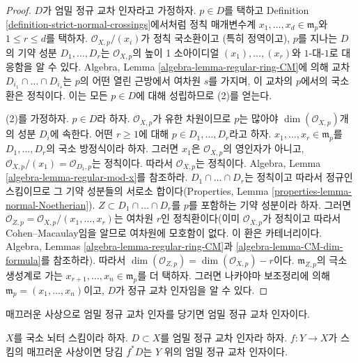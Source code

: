 \begin{proof}
$D$가 엄밀 정규 교차 인자라고 가정하자. $p \in D$를 택하고
Definition \ref{definition-strict-normal-crossings}에서처럼
정칙 매개변수계 $x_1, \ldots, x_d \in \mathfrak m_p$와
$1 \leq r \leq d$를 택하자.
$\mathcal{O}_{X, p}/(x_i)$가 정칙 국소환이고
(특히 정역이고), $p$를 지나는 $D$의 기약 성분
$D_1, \ldots, D_r$는 $\mathcal{O}_{X, p}$의 높이 1 소아이디얼
$(x_1), \ldots, (x_r)$와 $1$-대-$1$로 대응함을 알 수 있다.
Algebra, Lemma \ref{algebra-lemma-regular-ring-CM}에 의해
교차 $D_{i_1} \cap \ldots \cap D_{i_s}$는 $p$의 어떤 열린 근방에서
여차원 $s$를 가지며, 이 교차의 $p$에서의 국소환은 정칙이다.
이는 모든 $p \in D$에 대해 성립하므로 (2)를 얻는다.

\medskip\noindent
(2)를 가정하자. $p \in D$라 하자. $\mathcal{O}_{X, p}$가
유한 차원이므로 $p$는 많아야 $\dim(\mathcal{O}_{X, p})$개의
성분 $D_i$에 속한다. 어떤 $r \geq 1$에 대해
$p \in D_1, \ldots, D_r$라고 하자.
$x_1, \ldots, x_r \in \mathfrak m_p$를
$D_1, \ldots, D_r$의 국소 방정식이라 하자.
그러면 $x_1$은 $\mathcal{O}_{X, p}$의 영인자가 아니고,
$\mathcal{O}_{X, p}/(x_1) = \mathcal{O}_{D_1, p}$는 정칙이다.
따라서 $\mathcal{O}_{X, p}$는 정칙이다. Algebra, Lemma
\ref{algebra-lemma-regular-mod-x}를 참조하라.
$D_1 \cap \ldots \cap D_r$는 정칙이고 따라서 정규인 스킴이므로
그 기약 성분들의 서로소 합이다(Properties, Lemma
\ref{properties-lemma-normal-Noetherian}).
$Z \subset D_1 \cap \ldots \cap D_r$를 $p$를 포함하는 기약 성분이라 하자.
그러면 $\mathcal{O}_{Z, p} = \mathcal{O}_{X, p}/(x_1, \ldots, x_r)$는
여차원 $r$인 정칙환이다(이미 $\mathcal{O}_{X, p}$가 정칙이고 따라서
Cohen--Macaulay임을 알므로 여차원에 모호함이 없다. 이 환은 카테너리이다.
Algebra, Lemmas \ref{algebra-lemma-regular-ring-CM}과
\ref{algebra-lemma-CM-dim-formula}를 참조하라).
따라서 $\dim(\mathcal{O}_{Z, p}) = \dim(\mathcal{O}_{X, p}) - r$이다.
$\mathfrak m_{Z, p}$의 극소 생성계로 가는
$x_{r + 1}, \ldots, x_n \in \mathfrak m_p$를 더 택하자.
그러면 나카야마 보조정리에 의해
$\mathfrak m_p = (x_1, \ldots, x_n)$이고,
$D$가 정규 교차 인자임을 알 수 있다.
\end{proof}

\begin{lemma}
\label{lemma-smooth-pullback-strict-normal-crossings}
\begin{slogan}
매끄러운 사상으로 엄밀 정규 교차 인자를 당기면
엄밀 정규 교차 인자이다.
\end{slogan}
$X$를 국소 뇌터 스킴이라 하자. $D \subset X$를
엄밀 정규 교차 인자라 하자. $f : Y \to X$가 스킴의 매끄러운 사상이면
당김 $f^*D$는 $Y$ 위의 엄밀 정규 교차 인자이다.
\end{lemma}

